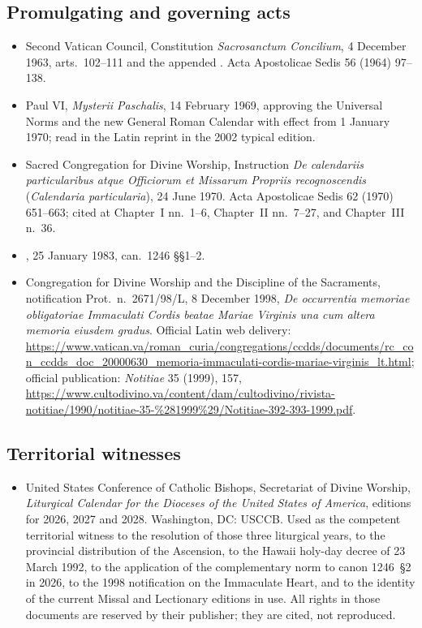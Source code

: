 \subsection{Promulgating and governing acts}

\begin{itemize}
\item Second Vatican Council, Constitution \emph{Sacrosanctum Concilium}, 4 December 1963,
arts.\ 102--111 and the appended . Acta Apostolicae
Sedis 56 (1964) 97--138.
\item Paul VI,  \emph{Mysterii Paschalis},
14 February 1969, approving the Universal Norms and the new General Roman Calendar with effect from
1 January 1970; read in the Latin reprint in the 2002 typical edition.
\item Sacred Congregation for Divine Worship, Instruction \emph{De calendariis particularibus atque
Officiorum et Missarum Propriis recognoscendis} (\emph{Calendaria particularia}), 24 June 1970. Acta
Apostolicae Sedis 62 (1970) 651--663; cited at Chapter~I nn.~1--6, Chapter~II nn.~7--27, and
Chapter~III n.~36.
\item {}, 25 January 1983, can.\ 1246 \S\S1--2.
\item Congregation for Divine Worship and the Discipline of the Sacraments, notification Prot.\
n.\ 2671/98/L, 8 December 1998, \emph{De occurrentia memoriae obligatoriae Immaculati Cordis
beatae Mariae Virginis una cum altera memoria eiusdem gradus}. Official Latin web delivery:
\url{https://www.vatican.va/roman_curia/congregations/ccdds/documents/rc_con_ccdds_doc_20000630_memoria-immaculati-cordis-mariae-virginis_lt.html};
official publication: \emph{Notitiae} 35 (1999), 157,
\url{https://www.cultodivino.va/content/dam/cultodivino/rivista-notitiae/1990/notitiae-35-\%281999\%29/Notitiae-392-393-1999.pdf}.
\end{itemize}

\subsection{Territorial witnesses}

\begin{itemize}
\item United States Conference of Catholic Bishops, Secretariat of Divine Worship, \emph{Liturgical
Calendar for the Dioceses of the United States of America}, editions for 2026, 2027 and 2028.
Washington, DC: USCCB. Used as the competent territorial witness to the resolution of those three
liturgical years, to the provincial distribution of the Ascension, to the Hawaii holy-day decree of
23 March 1992, to the application of the complementary norm to canon 1246~\S2 in 2026, to the 1998
notification on the Immaculate Heart, and to the identity of the current Missal and Lectionary
editions in use. All rights in those documents are reserved by their publisher; they are cited, not
reproduced.
\end{itemize}

